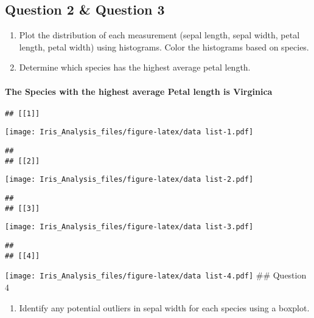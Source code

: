 \documentclass[
]{article}
\providecommand{\tightlist}{%
  \setlength{\itemsep}{0pt}\setlength{\parskip}{0pt}}
\begin{document}
\hypertarget{question-2-question-3}{%
\subsection{Question 2 \& Question 3}\label{question-2-question-3}}

\begin{enumerate}
\def\labelenumi{\arabic{enumi}.}
\setcounter{enumi}{1}
\item
  Plot the distribution of each measurement (sepal length, sepal width,
  petal length, petal width) using histograms. Color the histograms
  based on species.
\item
  Determine which species has the highest average petal length.
\end{enumerate}

\hypertarget{the-species-with-the-highest-average-petal-length-is-virginica}{%
\paragraph{The Species with the highest average Petal length is
Virginica}\label{the-species-with-the-highest-average-petal-length-is-virginica}}

\begin{verbatim}
## [[1]]
\end{verbatim}

\texttt{[image: Iris\_Analysis\_files/figure-latex/data list-1.pdf]}

\begin{verbatim}
## 
## [[2]]
\end{verbatim}

\texttt{[image: Iris\_Analysis\_files/figure-latex/data list-2.pdf]}

\begin{verbatim}
## 
## [[3]]
\end{verbatim}

\texttt{[image: Iris\_Analysis\_files/figure-latex/data list-3.pdf]}

\begin{verbatim}
## 
## [[4]]
\end{verbatim}

\texttt{[image: Iris\_Analysis\_files/figure-latex/data list-4.pdf]} \#\#
Question 4

\begin{enumerate}
\def\labelenumi{\arabic{enumi}.}
\setcounter{enumi}{3}
\tightlist
\item
  Identify any potential outliers in sepal width for each species using
  a boxplot.
\end{enumerate}
\end{document}
